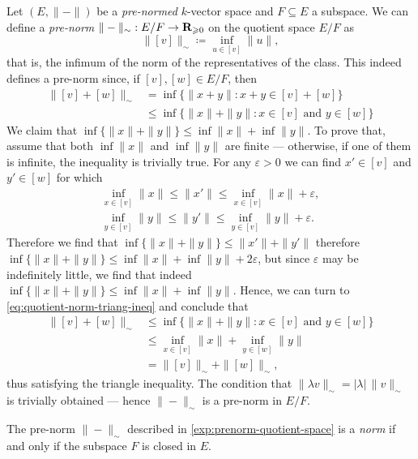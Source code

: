 \begin{example}
\label{exp:prenorm-quotient-space}
Let \((E, \| - \|)\) be a \emph{pre-normed} \(k\)-vector space and \(F
\subseteq E\) a subspace. We can define a \emph{pre-norm} \(\| - \|_{\sim}: E/F
\to \mathbf{R}_{\geqslant 0}\) on the quotient space \(E/F\) as
\[
  \| [v] \|_{\sim} \coloneq \inf_{u \in [v]} \| u \|,
\]
that is, the infimum of the norm of the representatives of the class. This
indeed defines a pre-norm since, if \([v], [w] \in E/F\), then
\begin{align}\label{eq:quotient-norm-triang-ineq}
  \nonumber
  \| [v] + [w] \|_{\sim}
  &= \inf \{\|x + y\| \colon x + y \in [v] + [w]\} \\
  &\leq \inf \{\| x \| + \| y \| \colon x \in [v] \text{ and } y \in [w]\}
\end{align}
We claim that \(\inf \{\| x \| + \| y \|\} \leq \inf \| x \| + \inf \| y
\|\). To prove that, assume that both \(\inf \| x \|\) and \(\inf \| y \|\) are
finite --- otherwise, if one of them is infinite, the inequality is trivially
true. For any \(\varepsilon > 0\) we can find \(x' \in [v]\) and \(y' \in
[w]\) for which
\begin{gather*}
\inf_{x \in [v]} \| x \|
\leq \| x' \|
\leq \inf_{x \in [v]} \| x \| + \varepsilon,
\\
\inf_{y \in [v]} \| y \|
\leq \| y' \|
\leq \inf_{y \in [v]} \| y \| + \varepsilon.
\end{gather*}
Therefore we find that \(\inf \{\| x \| + \| y \|\} \leq \| x' \| + \| y' \|\)
therefore \(\inf \{\| x \| + \| y \|\} \leq \inf \| x \| + \inf \| y \| + 2
\varepsilon\), but since \(\varepsilon\) may be indefinitely little, we find
that indeed \(\inf \{\| x \| + \| y \|\} \leq \inf \| x \| + \inf \| y
\|\). Hence, we can turn to \cref{eq:quotient-norm-triang-ineq} and conclude
that
\begin{align*}
\| [v] + [w] \|_{\sim}
&\leq \inf \{\| x \| + \| y \| \colon x \in [v] \text{ and } y \in [w]\} \\
&\leq \inf_{x \in [v]} \| x \| + \inf_{y \in [w]} \| y \| \\
&= \| [v] \|_{\sim} + \| [w] \|_{\sim},
\end{align*}
thus satisfying the triangle inequality. The condition that \(\| \lambda v
\|_{\sim} = |\lambda|\, \| v \|_{\sim}\) is trivially obtained --- hence \(\| -
\|_{\sim}\) is a pre-norm in \(E/F\).
\end{example}

\begin{proposition}
\label{prop:quotient-norm}
The pre-norm \(\| - \|_{\sim}\) described in \cref{exp:prenorm-quotient-space} is
a \emph{norm} if and only if the subspace \(F\) is closed in \(E\).
\end{proposition}

